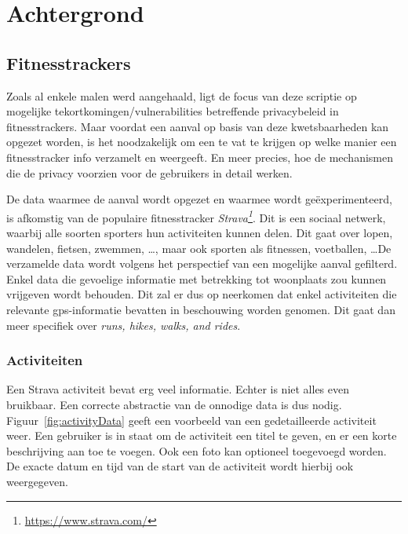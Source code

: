 
\chapter{Achtergrond}

\section{Fitnesstrackers}
Zoals al enkele malen werd aangehaald, ligt de focus van deze scriptie op
mogelijke tekortkomingen/vulnerabilities betreffende privacybeleid in
fitnesstrackers. Maar voordat een aanval op basis van deze kwetsbaarheden kan
opgezet worden, is het noodzakelijk om een te vat te krijgen op welke manier
een fitnesstracker info verzamelt en weergeeft. En meer precies, hoe de
mechanismen die de privacy voorzien voor de gebruikers in detail werken.

De data waarmee de aanval wordt opgezet en waarmee wordt geëxperimenteerd, is
afkomstig van de populaire fitnesstracker
\textit{Strava\footnote{\url{https://www.strava.com/}}}. Dit is een sociaal
netwerk, waarbij alle soorten sporters hun activiteiten kunnen delen. Dit gaat
over lopen, wandelen, fietsen, zwemmen, \ldots, maar ook sporten als fitnessen,
voetballen, \ldots De verzamelde data wordt volgens het perspectief van een
mogelijke aanval gefilterd. Enkel data die gevoelige informatie met betrekking
tot woonplaats zou kunnen vrijgeven wordt behouden. Dit zal er dus op neerkomen
dat enkel activiteiten die relevante \ac{gps}-informatie bevatten in
beschouwing worden genomen. Dit gaat dan meer specifiek over \textit{runs,
    hikes, walks, and rides}.

\subsection{Activiteiten}\label{data}
Een Strava activiteit bevat erg veel informatie. Echter is niet alles even
bruikbaar. Een correcte abstractie van de onnodige data is dus nodig.
Figuur~\ref{fig:activityData} geeft een voorbeeld van een gedetailleerde
activiteit weer. Een gebruiker is in staat om de activiteit een titel te geven,
en er een korte beschrijving aan toe te voegen. Ook een foto kan optioneel
toegevoegd worden. De exacte datum en tijd van de start van de activiteit wordt
hierbij ook weergegeven.

